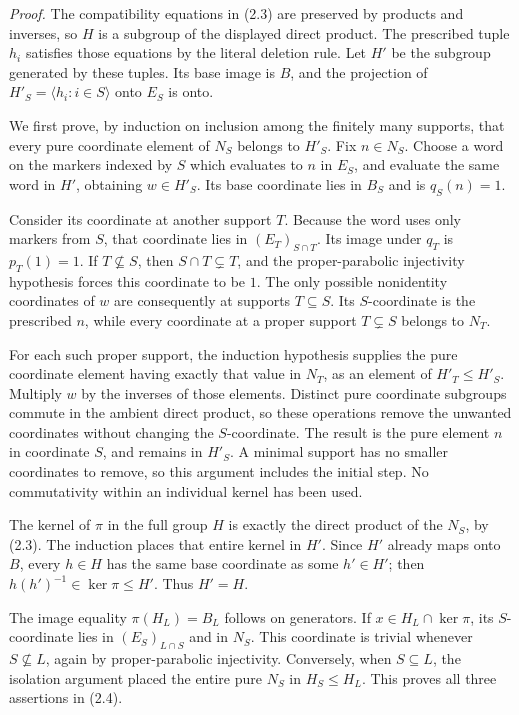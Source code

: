 \documentclass[
  11pt,
  a4paper,
]{article}
\begin{document}
\emph{Proof.} The compatibility equations in (2.3) are preserved by
products and inverses, so \(H\) is a subgroup of the displayed direct
product. The prescribed tuple \(h_i\) satisfies those equations by the
literal deletion rule. Let \(H'\) be the subgroup generated by these
tuples. Its base image is \(B\), and the projection of
\(H'_S=\langle h_i:i\in S\rangle\) onto \(E_S\) is onto.

We first prove, by induction on inclusion among the finitely many
supports, that every pure coordinate element of \(N_S\) belongs to
\(H'_S\). Fix \(n\in N_S\). Choose a word on the markers indexed by
\(S\) which evaluates to \(n\) in \(E_S\), and evaluate the same word in
\(H'\), obtaining \(w\in H'_S\). Its base coordinate lies in \(B_S\) and
is \(q_S(n)=1\).

Consider its coordinate at another support \(T\). Because the word uses
only markers from \(S\), that coordinate lies in \((E_T)_{S\cap T}\).
Its image under \(q_T\) is \(p_T(1)=1\). If \(T\not\subseteq S\), then
\(S\cap T\subsetneq T\), and the proper-parabolic injectivity hypothesis
forces this coordinate to be \(1\). The only possible nonidentity
coordinates of \(w\) are consequently at supports \(T\subseteq S\). Its
\(S\)-coordinate is the prescribed \(n\), while every coordinate at a
proper support \(T\subsetneq S\) belongs to \(N_T\).

For each such proper support, the induction hypothesis supplies the pure
coordinate element having exactly that value in \(N_T\), as an element
of \(H'_T\leq H'_S\). Multiply \(w\) by the inverses of those elements.
Distinct pure coordinate subgroups commute in the ambient direct
product, so these operations remove the unwanted coordinates without
changing the \(S\)-coordinate. The result is the pure element \(n\) in
coordinate \(S\), and remains in \(H'_S\). A minimal support has no
smaller coordinates to remove, so this argument includes the initial
step. No commutativity within an individual kernel has been used.

The kernel of \(\pi\) in the full group \(H\) is exactly the direct
product of the \(N_S\), by (2.3). The induction places that entire
kernel in \(H'\). Since \(H'\) already maps onto \(B\), every \(h\in H\)
has the same base coordinate as some \(h'\in H'\); then
\(h(h')^{-1}\in\ker\pi\leq H'\). Thus \(H'=H\).

The image equality \(\pi(H_L)=B_L\) follows on generators. If
\(x\in H_L\cap\ker\pi\), its \(S\)-coordinate lies in
\((E_S)_{L\cap S}\) and in \(N_S\). This coordinate is trivial whenever
\(S\not\subseteq L\), again by proper-parabolic injectivity. Conversely,
when \(S\subseteq L\), the isolation argument placed the entire pure
\(N_S\) in \(H_S\leq H_L\). This proves all three assertions in (2.4).
\end{document}
